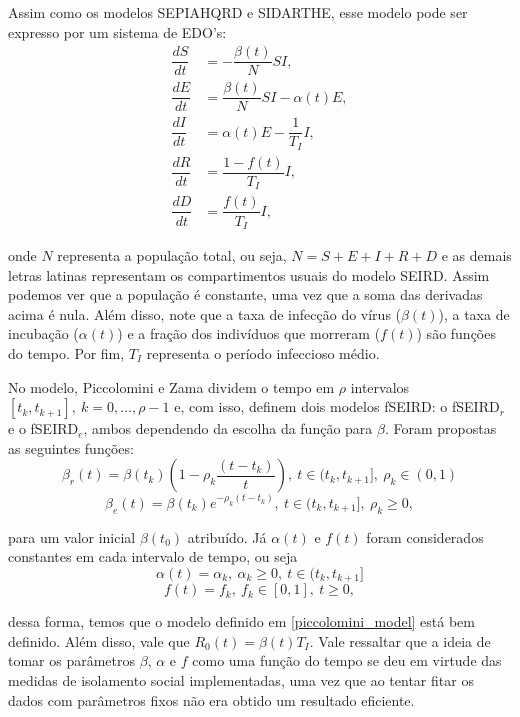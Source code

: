 \documentclass{article}
\begin{document}
Assim como os modelos SEPIAHQRD e SIDARTHE, esse modelo pode ser expresso por um sistema de EDO's:
\begin{equation}
    \label{piccolomini_model}
    \begin{split}
        \dfrac{dS}{dt} & = -\dfrac{\beta(t)}{N}SI, \\
        \dfrac{dE}{dt} & = \dfrac{\beta(t)}{N}SI - \alpha(t) E, \\
        \dfrac{dI}{dt} & = \alpha(t) E - \dfrac{1}{T_I}I, \\
        \dfrac{dR}{dt} & = \dfrac{1 - f(t)}{T_I}I, \\
        \dfrac{dD}{dt} & = \dfrac{f(t)}{T_I}I,
    \end{split}
\end{equation}

\noindent onde $N$ representa a população total, ou seja, $N = S + E + I + R + D$ e as demais letras latinas representam os compartimentos usuais do modelo SEIRD. Assim podemos ver que a população é constante, uma vez que a soma das derivadas acima é nula. Além disso, note que a taxa de infecção do vírus ($\beta(t)$), a taxa de incubação ($\alpha(t)$) e a fração dos indivíduos que morreram ($f(t)$) são funções do tempo. Por fim, $T_I$ representa o período infeccioso médio.

No modelo, Piccolomini e Zama dividem o tempo em $\rho$ intervalos $[t_k, t_{k + 1}], ~k = 0, \dots, \rho -1$ e, com isso, definem dois modelos fSEIRD: o fSEIRD$_r$ e o fSEIRD$_e$, ambos dependendo da escolha da função para $\beta$. Foram propostas as seguintes funções:
\[\beta_r(t) = \beta(t_k)\left(1 - \rho_k\dfrac{(t - t_k)}{t}\right), ~t \in (t_k, t_{k + 1}], ~\rho_k \in (0, 1)\]
\[\beta_e(t) = \beta(t_k)e^{- \rho_k(t - t_k)}, ~t \in (t_k, t_{k + 1}], ~\rho_k \geq 0,\]

\noindent para um valor inicial $\beta(t_0)$ atribuído. Já $\alpha(t)$ e $f(t)$ foram considerados constantes em cada intervalo de tempo, ou seja
\[\alpha(t) = \alpha_k, ~\alpha_k \geq 0, ~t \in (t_k, t_{k + 1}]\]
\[f(t) = f_k, ~f_k \in [0, 1], ~t \geq 0,\]

\noindent dessa forma, temos que o modelo definido em \ref{piccolomini_model} está bem definido. Além disso, vale que $R_0(t) = \beta(t)T_I$. Vale ressaltar que a ideia de tomar os parâmetros $\beta$, $\alpha$ e $f$ como uma função do tempo se deu em virtude das medidas de isolamento social implementadas, uma vez que ao tentar fitar os dados com parâmetros fixos não era obtido um resultado eficiente.
\end{document}
